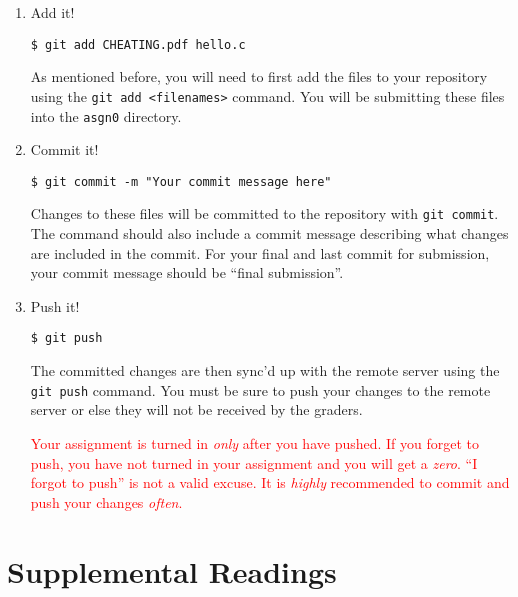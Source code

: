 \documentclass[11pt]{article}
\newcommand\asgn[0]{asgn0}
\begin{document}
\begin{enumerate}
  \item Add it!

\begin{lstlisting}[style=bashstyle]
  $ git add CHEATING.pdf hello.c
\end{lstlisting}

    As mentioned before, you will need to first add the files to
    your repository using the \texttt{git add <filenames>} command. You
    will be submitting these files into the \texttt{\asgn}
    directory.

  \item Commit it!

\begin{lstlisting}[style=bashstyle]
  $ git commit -m "Your commit message here"
\end{lstlisting}

  Changes to these files will be committed to the repository with \texttt{git
  commit}. The command should also include a commit message describing what
  changes are included in the commit. For your final and last commit for
  submission, your commit message should be ``final submission''.

  \item Push it!

\begin{lstlisting}[style=bashstyle]
  $ git push
\end{lstlisting}

  The committed changes are then sync'd up with the remote server
  using the \texttt{git push} command. You must be sure to push your
  changes to the remote server or else they will not be received by
  the graders.

  \textcolor{red}{Your assignment is turned in \emph{only} after you have
  pushed. If you forget to push, you have not turned in your assignment and you
  will get a \emph{zero}. ``I forgot to push'' is not a valid excuse. It is
  \emph{highly} recommended to commit and push your changes \emph{often}.}
\end{enumerate}

\section{Supplemental Readings}

\end{document}
